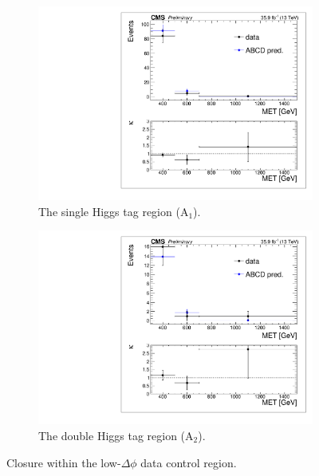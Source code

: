 \begin{figure}[htbp]
\begin{subfigure}[b]{0.5\textwidth}
\centering
\includegraphics[trim={5px 5px 5px 5px},clip,width=\textwidth]{figs/SUS17006/dataClosure_single-tagSR_lowDphi.pdf}
\caption{The single Higgs tag region (A$_{1}$).}
\end{subfigure}
\begin{subfigure}[b]{0.5\textwidth}
\centering
\includegraphics[trim={5px 5px 5px 5px},clip,width=\textwidth]{figs/SUS17006/dataClosure_double-tagSR_lowDphi.pdf} 
\caption{The double Higgs tag region (A$_{2}$).}
\end{subfigure}
\caption{Closure within the low-$\Delta\phi$ data control region.}
\label{fig:closurelowdphi}
\end{figure}

